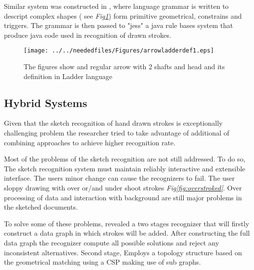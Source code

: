 Similar system was constructed in \cite {Ladder30} , where language grammar is written to descript complex shapes ( see \textit{Fig\ref{fig:arrowladderdef1}}) form primitive geometrical, constrains and triggers. The grammar is then passed to "jess" a java rule bases system that produce java code used in recognition of  drawn strokes.

\begin{figure}
	\centering
	\begin {center}
			\centering

			{\label {fig:arrow1}\texttt{[image: ../../neededfiles/Figures/arrowladderdef1.eps]}}
		\end {center}
	\caption[Arrow definition]{The figures show and regular arrow with 2 shafts and head and its definition in Ladder language \cite{Ladder30}}
	\label{fig:arrowladderdef1}
\end{figure}








\subsection{Hybrid Systems}
\label{sec:Hybrid Systems}

Given that the sketch recognition of hand drawn strokes is exceptionally challenging problem the researcher tried to take advantage of additional of combining approaches to achieve higher recognition rate.

Most of the problems of the sketch recognition are not still addressed. To do so, The sketch recognition system must maintain reliably interactive and extensible interface.  The users minor change can cause the recognizers to fail. The user sloppy drawing with over or/and under shoot strokes  \textit{Fig\ref{fig:overstroked}}. Over processing of data and interaction with background are still major problems in the sketched documents.  

To solve some of these problems,\cite{threeproblmes23}  revealed a two stages recognizer that will firstly construct a data graph in which strokes will be added. After constructing the full data graph the recognizer compute all possible solutions and reject any inconsistent alternatives. Second stage, Employs a topology structure based on the geometrical matching using a CSP making use of sub graphs.  

